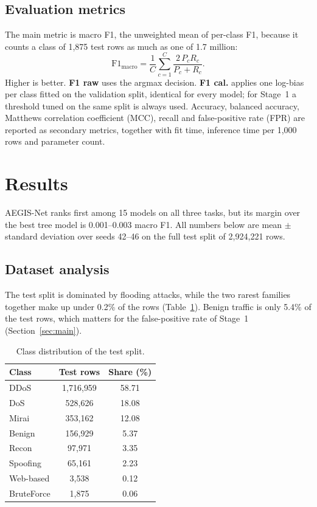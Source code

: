 \documentclass[11pt,a4paper]{article}
\newcommand{\aegis}{AEGIS-Net}
\begin{document}
\subsection{Evaluation metrics}
The main metric is macro F1, the unweighted mean of per-class F1, because it counts a class of 1{,}875 test rows as much as one of 1.7 million:
\begin{equation}
  \mathrm{F1}_{\mathrm{macro}} = \frac{1}{C}\sum_{c=1}^{C} \frac{2\,P_c R_c}{P_c + R_c}.
\end{equation}
Higher is better. \textbf{F1 raw} uses the argmax decision. \textbf{F1 cal.} applies one log-bias per class fitted on the validation split, identical for every model; for Stage~1 a threshold tuned on the same split is always used. Accuracy, balanced accuracy, Matthews correlation coefficient (MCC), recall and false-positive rate (FPR) are reported as secondary metrics, together with fit time, inference time per 1{,}000 rows and parameter count.

\section{Results}
\aegis{} ranks first among 15 models on all three tasks, but its margin over the best tree model is 0.001--0.003 macro F1. All numbers below are mean $\pm$ standard deviation over seeds 42--46 on the full test split of 2{,}924{,}221 rows.

\subsection{Dataset analysis}
The test split is dominated by flooding attacks, while the two rarest families together make up under 0.2\% of the rows (Table~\ref{tab:classes}). Benign traffic is only 5.4\% of the test rows, which matters for the false-positive rate of Stage~1 (Section~\ref{sec:main}).

\begin{table}[h]
\centering\small
\caption{Class distribution of the test split.}\label{tab:classes}
\begin{tabular}{@{}lcc@{}}
\toprule
Class & Test rows & Share (\%) \\
\midrule
DDoS & 1{,}716{,}959 & 58.71 \\
DoS & 528{,}626 & 18.08 \\
Mirai & 353{,}162 & 12.08 \\
Benign & 156{,}929 & 5.37 \\
Recon & 97{,}971 & 3.35 \\
Spoofing & 65{,}161 & 2.23 \\
Web-based & 3{,}538 & 0.12 \\
BruteForce & 1{,}875 & 0.06 \\
\bottomrule
\end{tabular}
\end{table}
\end{document}
